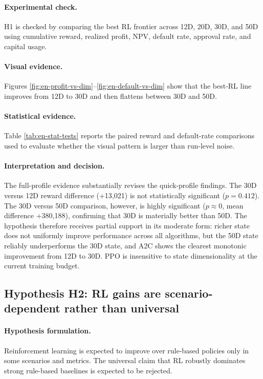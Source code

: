\documentclass[12pt,a4paper]{article}
\begin{document}
\paragraph{Experimental check.}
H1 is checked by comparing the best RL frontier across 12D, 20D, 30D, and 50D using cumulative reward, realized profit, NPV, default rate, approval rate, and capital usage.

\paragraph{Visual evidence.}
Figures \ref{fig:en-profit-vs-dim}--\ref{fig:en-default-vs-dim} show that the best-RL line improves from 12D to 30D and then flattens between 30D and 50D.

\paragraph{Statistical evidence.}
Table \ref{tab:en-stat-tests} reports the paired reward and default-rate comparisons used to evaluate whether the visual pattern is larger than run-level noise.

\paragraph{Interpretation and decision.}
The full-profile evidence substantially revises the quick-profile findings. The 30D versus 12D reward difference (+13{,}021) is not statistically significant ($p = 0.412$). The 30D versus 50D comparison, however, is highly significant ($p \approx 0$, mean difference +380{,}188), confirming that 30D is materially better than 50D. The hypothesis therefore receives partial support in its moderate form: richer state does not uniformly improve performance across all algorithms, but the 50D state reliably underperforms the 30D state, and A2C shows the clearest monotonic improvement from 12D to 30D. PPO is insensitive to state dimensionality at the current training budget.

\subsection{Hypothesis H2: RL gains are scenario-dependent rather than universal}

\paragraph{Hypothesis formulation.}
Reinforcement learning is expected to improve over rule-based policies only in some scenarios and metrics. The universal claim that RL robustly dominates strong rule-based baselines is expected to be rejected.
\end{document}
